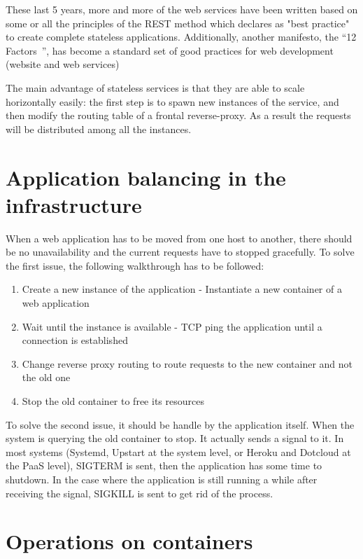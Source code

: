 These last 5 years, more and more of the web services have been written based
on some or all the principles of the REST method which declares as "best
practice" to create complete stateless applications. Additionally, another
manifesto, the ``12 Factors~\cite{website12Factors}'', has become a standard
set of good practices for web development (website and web services)

The main advantage of stateless services is that they are able to scale
horizontally easily: the first step is to spawn new instances of the service,
and then modify the routing table of a frontal reverse-proxy. As a result the
requests will be distributed among all the instances.

\section{Application balancing in the infrastructure}

When a web application has to be moved from one host to another, there should
be no unavailability and the current requests have to stopped gracefully. To
solve the first issue, the following walkthrough has to be followed:

\begin{enumerate}
	\item{Create a new instance of the application - Instantiate a new
	container of a web application}
	\item{Wait until the instance is available - TCP ping the application
	until a connection is established}
	\item{Change reverse proxy routing to route requests to the new
	container and not the old one}
	\item{Stop the old container to free its resources}
\end{enumerate}

To solve the second issue, it should be handle by the application itself. When
the system is querying the old container to stop. It actually sends a signal to
it. In most systems (Systemd, Upstart at the system level, or Heroku and
Dotcloud at the PaaS level), SIGTERM is sent, then the application has some
time to shutdown. In the case where the application is still running a while
after receiving the signal, SIGKILL is sent to get rid of the process.

\section{Operations on containers}

